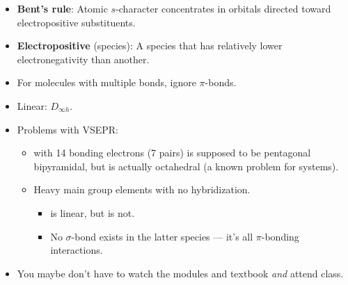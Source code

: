 \documentclass[../main.tex]{subfiles}
\begin{document}
\begin{itemize}
    \item \textbf{Bent's rule}: Atomic $s$-character concentrates in orbitals directed toward electropositive substituents.
    \item \textbf{Electropositive} (species): A species that has relatively lower electronegativity than another.
    \item For molecules with multiple bonds, ignore $\pi$-bonds.
    \item Linear: $D_{\infty h}$.
    \item Problems with VSEPR:
    \begin{itemize}
        \item {} with 14 bonding electrons (7 pairs) is supposed to be pentagonal bipyramidal, but is actually octahedral (a known problem for  systems).
        \item Heavy main group elements with no hybridization.
        \begin{itemize}
            \item {} is linear, but  is not.
            \item No $\sigma$-bond exists in the latter species --- it's all $\pi$-bonding interactions.
        \end{itemize}
    \end{itemize}
    \item You maybe don't have to watch the modules and textbook \emph{and} attend class.
\end{itemize}
\end{document}
